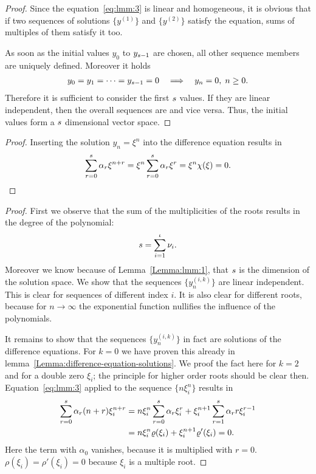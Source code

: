 \begin{proof}
  Since the equation~\eqref{eq:lmm:3} is linear and homogeneous, it is
  obvious that if two sequences of solutions $\{y^{(1)}\}$ and
  $\{y^{(2)}\}$ satisfy the equation, sums of multiples of them
  satisfy it too.

  As soon as the initial values $y_0$ to $y_{s-1}$ are chosen, all
  other sequence members are uniquely defined.  Moreover it holds
  \begin{gather*}
    y_0=y_1=\dots=y_{s-1}=0
    \quad\Longrightarrow\quad
    y_n = 0, \;n \ge 0.
  \end{gather*}
  Therefore it is sufficient to consider the first $s$ values.  If
  they are linear independent, then the overall sequences are and vice
  versa. Thus, the initial values form a $s$
  dimensional vector space.
\end{proof}



\begin{proof}
  Inserting the solution $y_n = \xi^n$ into the difference equation
  results in
  \begin{gather*}
    \sum_{r=0}^s \alpha_{r} \xi^{n+r} = \xi^{n}
    \sum_{r=0}^s \alpha_{r} \xi^{r}
    = \xi^{n} \chi(\xi) = 0.
  \end{gather*}
\end{proof}



\begin{proof}
  First we observe that the sum of the multiplicities of the roots
  results in the degree of the polynomial:
  \begin{gather*}
    s = \sum_{i=1}^\iota \nu_i.
  \end{gather*}
  Moreover we know because of Lemma~\ref{Lemma:lmm:1}, that $s$ is
  the dimension of the solution space. We show that the sequences
  $\{y^{(i,k)}_n\}$ are linear independent. This is clear for
  sequences of different index $i$. It is also clear for different roots,
  because for $n\to\infty$ the exponential function nullifies the
  influence of the polynomials.
  
  It remains to show that the sequences $\{y^{(i,k)}_n\}$ in fact are
  solutions of the difference equations.  For $k=0$ we have proven
  this already in lemma~\ref{Lemma:difference-equation-solutions}.  We proof the fact here for
  $k=2$ and for a double zero $\xi_i$; the principle for higher order
  roots should be clear then.  Equation~\eqref{eq:lmm:3} applied to
  the sequence $\{n \xi_i^n\}$ results in
  \begin{align*}
    \sum_{r=0}^{s} \alpha_r (n+r) \xi_i^{n+r}
    &= n \xi_i^n \sum_{r=0}^{s} \alpha_r \xi_i^{r}
    + \xi_i^{n+1} \sum_{r=1}^{s} \alpha_r r \xi_i^{r-1}
    \\
    &= n \xi_i^n \varrho(\xi_i) + \xi_i^{n+1} \varrho'(\xi_i) = 0.
  \end{align*}
  Here the term with $\alpha_0$ vanishes, because it is multiplied
  with $r=0$. $\rho(\xi_i) = \rho'(\xi_i) = 0$ because $\xi_i$ is a
  multiple root.
\end{proof}

